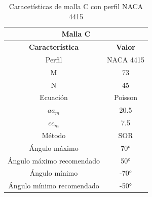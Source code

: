 \documentclass[letterpaper, openright, 12pt]{book}
\begin{document}
    \begin{table}[htbp!]
    \begin{center}
        \begin{tabular}{| c | c |}
        \hline
        \multicolumn{2}{|c|}{Malla C}\\

        \hline
        \textbf{Característica} & \textbf{Valor} \\ \hline

        Perfil & NACA 4415
        \\ \hline

        M & 73
        \\ \hline

        N & 45
        \\ \hline

        Ecuación & Poisson
        \\\hline

        $aa_m$ & 20.5
        \\ \hline

        $cc_m$ & 7.5
        \\ \hline

        Método & SOR
        \\\hline

        Ángulo máximo & 70\si{\degree}
        \\ \hline

        Ángulo máximo recomendado & 50\si{\degree}
        \\ \hline

        Ángulo mínimo & -70\si{\degree}
        \\ \hline

        Ángulo mínimo recomendado & -50\si{\degree}
        \\ \hline
        \end{tabular}
        \caption{Caracetísticas de malla C con perfil NACA 4415}
    \label{tabla_c_naca_4415}
    \end{center}
    \end{table}
\end{document}
